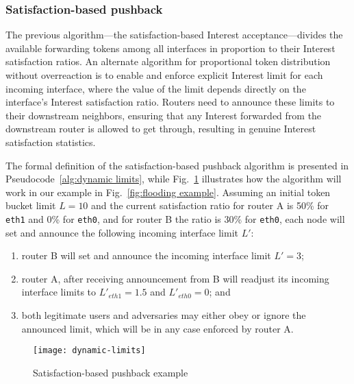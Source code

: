 
\subsubsection{\textbf{Satisfaction-based pushback}}
\label{sec:dynamic limits}


The previous algorithm---the satisfaction-based Interest acceptance---divides the available forwarding tokens among all interfaces in proportion to their Interest satisfaction ratios.
An alternate algorithm for proportional token distribution without overreaction is to enable and enforce explicit Interest limit for each incoming interface, where the value of the limit depends directly on the interface's Interest satisfaction ratio.
Routers need to announce these limits to their downstream neighbors, ensuring that any Interest forwarded from the downstream router is allowed to get through, resulting in genuine Interest satisfaction statistics.

The formal definition of the satisfaction-based pushback algorithm is presented in Pseudocode~\ref{alg:dynamic limits}, while Fig.~\ref{fig:dynamic limits example} illustrates how the algorithm will work in our example in Fig.~\ref{fig:flooding example}.
Assuming an initial token bucket limit $L=10$ and the current satisfaction ratio for router A is 50\% for \texttt{eth1} and 0\% for \texttt{eth0}, and for router B the ratio is 30\% for \texttt{eth0}, each node will set and announce the following  incoming interface limit $L'$: 
\begin{enumerate}
\item router B will set and announce the incoming interface limit $L'=3$;
\item router A, after receiving announcement from B will readjust its incoming interface limits to $L'_{eth1} = 1.5$ and $L'_{eth0} = 0$; and
\item both legitimate users and adversaries may either obey or ignore the announced limit, which will be in any case enforced by router A.
\end{enumerate}


\begin{figure}[htbp]
  \centering
  \texttt{[image: dynamic-limits]}
  \vspace{-0.3cm}
  \caption{Satisfaction-based pushback example
}
  \label{fig:dynamic limits example}
\end{figure}


